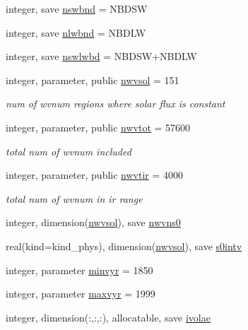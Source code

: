 \begin{DoxyCompactItemize}
integer, save \hyperlink{group__module__radiation__aerosols_ga1d6c41e3bb818aa8b6f8f10d1c3f38a7}{nswbnd} = N\+B\+D\+SW
\item 
integer, save \hyperlink{group__module__radiation__aerosols_gab17b7f75d6d737fd2fc81eae44cba81d}{nlwbnd} = N\+B\+D\+LW
\item 
integer, save \hyperlink{group__module__radiation__aerosols_gab77b3b4aa76361277d828c7ba5dc3eda}{nswlwbd} = N\+B\+D\+SW+N\+B\+D\+LW
\item 
integer, parameter, public \hyperlink{group__module__radiation__aerosols_ga2e0dc6d161d1906050efd67c471673c9}{nwvsol} = 151
\begin{DoxyCompactList}\small\item\em num of wvnum regions where solar flux is constant \end{DoxyCompactList}\item 
integer, parameter, public \hyperlink{group__module__radiation__aerosols_gae94df49c8ff8c0ec8e6b8adb891f3c6b}{nwvtot} = 57600
\begin{DoxyCompactList}\small\item\em total num of wvnum included \end{DoxyCompactList}\item 
integer, parameter, public \hyperlink{group__module__radiation__aerosols_ga45b2c26ccba5d4fd2dfccf31bcc02824}{nwvtir} = 4000
\begin{DoxyCompactList}\small\item\em total num of wvnum in ir range \end{DoxyCompactList}\item 
integer, dimension(\hyperlink{group__module__radiation__aerosols_ga2e0dc6d161d1906050efd67c471673c9}{nwvsol}), save \hyperlink{group__module__radiation__aerosols_ga80194c8356dfb92a43306abbe7097711}{nwvns0}
\item 
real(kind=kind\+\_\+phys), dimension(\hyperlink{group__module__radiation__aerosols_ga2e0dc6d161d1906050efd67c471673c9}{nwvsol}), save \hyperlink{group__module__radiation__aerosols_gaed8bb8a8bc26d72a6c3d31ed4430941f}{s0intv}
\item 
integer, parameter \hyperlink{group__module__radiation__aerosols_gab37644d8cc2c222af700b86db91f05e7}{minvyr} = 1850
\item 
integer, parameter \hyperlink{group__module__radiation__aerosols_gad856a3d564ff84043219626759673f27}{maxvyr} = 1999
\item 
integer, dimension(\+:,\+:,\+:), allocatable, save \hyperlink{group__module__radiation__aerosols_gab016f51c81a1157ee234dc82f8f114ee}{ivolae}

\end{DoxyCompactItemize}
